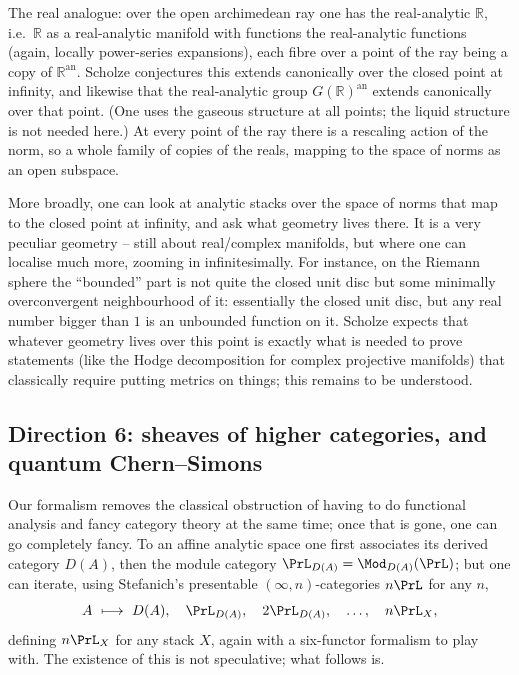 The real analogue: over the open archimedean ray one has the real-analytic
$\mathbb R$, i.e.\ $\mathbb R$ as a real-analytic manifold with functions the
real-analytic functions (again, locally power-series expansions), each fibre over
a point of the ray being a copy of $\mathbb R^{\mathrm{an}}$. Scholze conjectures
this extends canonically over the closed point at infinity, and likewise that the
real-analytic group $G(\mathbb R)^{\mathrm{an}}$ extends canonically over that
point. (One uses the gaseous structure at all points; the liquid structure is not
needed here.) At every point of the ray there is a rescaling action of the norm,
so a whole family of copies of the reals, mapping to the space of norms as an open
subspace.

\begin{remark}
\label{rmk:24:geometry-at-infinity}
More broadly, one can look at analytic stacks over the space of norms that map to
the closed point at infinity, and ask what geometry lives there. It is a very
peculiar geometry -- still about real/complex manifolds, but where one can
localise much more, zooming in infinitesimally. For instance, on the Riemann
sphere the ``bounded'' part is not quite the closed unit disc but some minimally
overconvergent neighbourhood of it: essentially the closed unit disc, but any
real number bigger than $1$ is an unbounded function on it. Scholze expects that
whatever geometry lives over this point is exactly what is needed to prove
statements (like the Hodge decomposition for complex projective manifolds) that
classically require putting metrics on things; this remains to be understood.
\end{remark}

\subsection{Direction 6: sheaves of higher categories, and quantum
Chern--Simons}
\label{subsec:24:higher-cats}

Our formalism removes the classical obstruction of having to do functional
analysis and fancy category theory at the same time; once that is gone, one can
go completely fancy. To an affine analytic space one first associates its derived
category $D(A)$, then the module category $\PrL_{D(A)}=\Mod_{D(A)}(\PrL)$; but
one can iterate, using Stefanich's presentable $(\infty,n)$-categories
$n\PrL$ for any $n$,
\begin{equation*}
A\ \longmapsto\ D(A),\quad \PrL_{D(A)},\quad 2\PrL_{D(A)},\quad \dots,\quad
n\PrL_X ,
\end{equation*}
defining $n\PrL_X$ for any stack $X$, again with a six-functor formalism to play
with. The existence of this is not speculative; what follows is.

